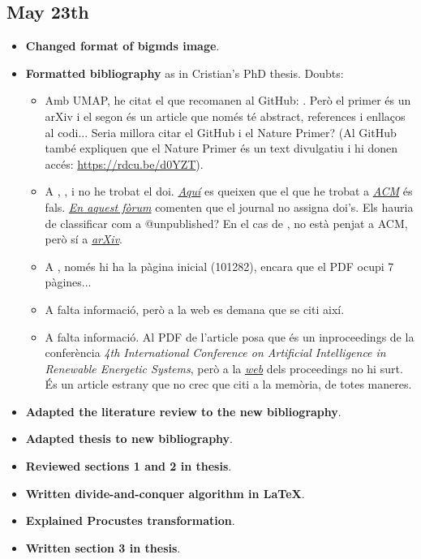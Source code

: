 \documentclass[a4paper,12pt]{article}
\begin{document}
\subsection{May 23th}
\begin{itemize}
    \item \textbf{Changed format of bigmds image}.
    \item \textbf{Formatted bibliography} as in Cristian's PhD thesis. Doubts:\begin{itemize}
        \item Amb UMAP, he citat el que recomanen al GitHub: \cite{McInnes2018a,McInnes2018b}. Però el primer és un arXiv i el segon és un article que només té abstract, references i enllaços al codi... Seria millora citar el GitHub i el Nature Primer? (Al GitHub també expliquen que el Nature Primer és un text divulgatiu i hi donen accés: \href{https://rdcu.be/d0YZT}{https://rdcu.be/d0YZT}).
        \item A \cite{Pedregosa2011}, \cite{Vandermaaten2014}, \cite{Vandermaaten2008} i \cite{Mcqueen2016} no he trobat el doi. \textit{\href{https://nickwalker.us/blog/2024/acm-dl-fake-dois/}{Aquí}} es queixen que el que he trobat a \textit{\href{https://dl.acm.org/doi/10.5555/1953048.2078195}{ACM}} és fals. \textit{\href{https://academia.stackexchange.com/questions/144097/doi-for-jmlr-papers}{En aquest fòrum}} comenten que el journal no assigna doi's. Els hauria de classificar com a @unpublished? En el cas de \cite{Mcqueen2016}, no està penjat a ACM, però sí a \textit{\href{https://arxiv.org/abs/1603.0276}{arXiv}}.
        \item A \cite{Menvouta2023}, només hi ha la pàgina inicial (101282), encara que el PDF ocupi 7 pàgines...
        \item A \cite{Wattenberg2016} falta informació, però a la web es demana que se citi així.
        \item A \cite{Salah2020} falta informació. Al PDF de l'article posa que és un inproceedings de la conferència \textit{4th International Conference on Artificial Intelligence in Renewable Energetic Systems}, però a la \textit{\href{https://link.springer.com/book/10.1007/978-3-030-63846-7?page=4}{web}} dels proceedings no hi surt. És un article estrany que no crec que citi a la memòria, de totes maneres.
    \end{itemize}
    \item \textbf{Adapted the literature review to the new bibliography}.
    \item \textbf{Adapted thesis to new bibliography}.
    \item \textbf{Reviewed sections 1 and 2 in thesis}.
    \item \textbf{Written divide-and-conquer algorithm in \LaTeX}.
    \item \textbf{Explained Procustes transformation}.
    \item \textbf{Written section 3 in thesis}.
\end{itemize}
\end{document}
